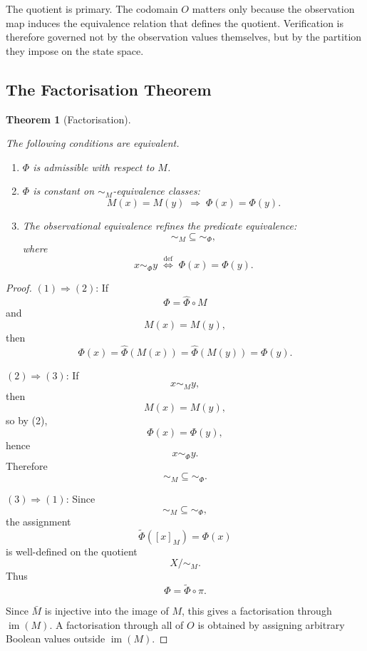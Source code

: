 \documentclass[pdflatex,sn-mathphys-num]{sn-jnl}
\theoremstyle{plain}
\newtheorem{theorem}{Theorem}[section]
\theoremstyle{definition}
\theoremstyle{remark}
\begin{document}
The quotient is primary.
The codomain $O$ matters only because the observation map induces the
equivalence relation that defines the quotient.
Verification is therefore governed not by the observation values
themselves, but by the partition they impose on the state space.

\subsection{The Factorisation Theorem}

\begin{theorem}[Factorisation]
\label{thm:factorisation}

The following conditions are equivalent.

\begin{enumerate}[label=(\arabic*),noitemsep]
  \item $\Phi$ is admissible with respect to $M$.

  \item $\Phi$ is constant on $\sim_M$-equivalence classes:
        \[
        M(x) = M(y)
        \;\Rightarrow\;
        \Phi(x) = \Phi(y).
        \]

  \item The observational equivalence refines the predicate
        equivalence:
        \[
        \sim_M \subseteq \sim_{\Phi},
        \]
        where
        \[
        x \sim_{\Phi} y
        \;\stackrel{\mathrm{def}}{\iff}\;
        \Phi(x) = \Phi(y).
        \]
\end{enumerate}
\end{theorem}

\begin{proof}

$(1)\Rightarrow(2)$:
If
\[
\Phi = \hat{\Phi} \circ M
\]
and
\[
M(x) = M(y),
\]
then
\[
\Phi(x)
=
\hat{\Phi}(M(x))
=
\hat{\Phi}(M(y))
=
\Phi(y).
\]

$(2)\Rightarrow(3)$:
If
\[
x \sim_M y,
\]
then
\[
M(x) = M(y),
\]
so by (2),
\[
\Phi(x) = \Phi(y),
\]
hence
\[
x \sim_{\Phi} y.
\]
Therefore
\[
\sim_M \subseteq \sim_{\Phi}.
\]

$(3)\Rightarrow(1)$:
Since
\[
\sim_M \subseteq \sim_{\Phi},
\]
the assignment
\[
\widetilde{\Phi}([x]_M) = \Phi(x)
\]
is well-defined on the quotient
\[
X/{\sim_M}.
\]
Thus
\[
\Phi = \widetilde{\Phi} \circ \pi.
\]

Since $\bar{M}$ is injective into the image of $M$, this gives a
factorisation through $\operatorname{im}(M)$.
A factorisation through all of $O$ is obtained by assigning arbitrary
Boolean values outside $\operatorname{im}(M)$.
\end{proof}
\end{document}
